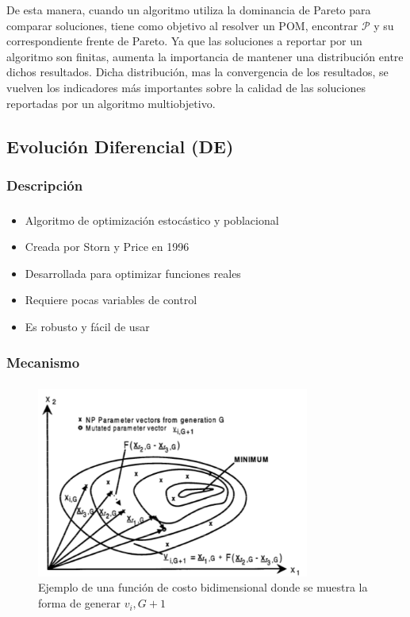 \documentclass[serif]{beamer}
\begin{document}
\begin{frame}
De esta manera, cuando un algoritmo utiliza la dominancia de Pareto para comparar soluciones, tiene como objetivo al resolver un POM, encontrar $\mathcal{P}$ y su correspondiente frente de Pareto. Ya que las soluciones a reportar por un algoritmo son finitas, aumenta la importancia de mantener una distribuci\'{o}n entre dichos resultados. Dicha distribuci\'{o}n, mas la convergencia de los resultados, se vuelven los indicadores m\'{a}s importantes sobre la calidad de las soluciones reportadas por un algoritmo multiobjetivo.
\end{frame}


\subsection{Evolución Diferencial (DE)}

\subsubsection{Descripción}
\begin{frame}
\frametitle{\insertsubsubsection}
	\begin{itemize}\setlength{\itemsep}{4mm}
		\item Algoritmo de optimización estocástico y poblacional
		\item Creada por Storn y Price en 1996
		\item Desarrollada para optimizar funciones reales
		\item Requiere pocas variables de control
		\item Es robusto y fácil de usar
	\end{itemize}
\end{frame}

\subsubsection{Mecanismo}
\begin{frame}
\frametitle{\insertsubsubsection}
	\vspace*{-0.2cm}
	\begin{figure}
	\centering
	\includegraphics[width=0.8\textwidth]{de.png}
	\caption{Ejemplo de una función de costo bidimensional donde se muestra la forma de generar $v_i,G+1$}
	\end{figure}
\end{frame}
\end{document}
